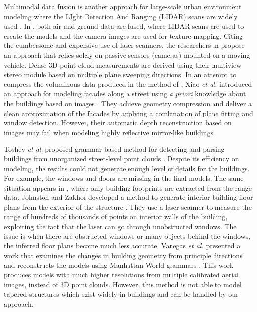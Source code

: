 \documentclass[10pt,journal,cspaper,compsoc]{IEEEtran}
\begin{document}
Multimodal data fusion is another approach for large-scale urban environment modeling 
where the LIght Detection And Ranging (LIDAR) scans are widely used \cite{UM_HYN}.
In \cite{UM_Zakhor}, both air and ground data are fused, 
where LIDAR scans are used to create the models 
and the camera images are used for texture mapping.
Citing the cumbersome and expensive use of laser scanners, the researchers
in \cite{AKBARZADEH06} propose an approach that relies solely on passive
sensors (cameras) mounted on a moving vehicle.
Dense 3D point cloud measurements are derived using their multiview stereo
module based on multiple plane sweeping directions.
In an attempt to compress the voluminous data produced in the method of
\cite{AKBARZADEH06}, 
Xiao {\it et al.} introduced an approach for modeling facades along a street 
using {\it a priori} knowledge about the buildings based on images \cite{UM_XFTQ}.
They achieve geometry compression and deliver a clean approximation of the
facades by applying a combination of plane fitting and window detection.
However, their automatic depth reconstruction based on images may fail
when modeling highly reflective mirror-like buildings.

Toshev {\it et al.} proposed grammar based method for detecting and parsing 
buildings from unorganized street-level point clouds \cite{RW_TMT} .
Despite its efficiency on modeling, the results could not generate 
enough level of details for the buildings. 
For example, the windows and doors are missing in the final models.
The same situation appears in \cite{RW_HDP}, where only building footprints 
are extracted from the range data.
Johnston and Zakhor developed a method to generate
interior building floor plans from the exterior of the structure \cite{RW_JZ}.
They use a laser scanner to measure the range of
hundreds of thousands of points on interior walls of the building, 
exploiting the fact that the laser can go through unobstructed windows.
The issue is when there are obstructed windows or many objects behind the windows, 
the inferred floor plans become much less accurate.
Vanegas {\it et al.} presented a work that examines the changes in
building geometry from principle directions and reconstructs the models 
using Manhattan-World grammars \cite{RW_VAB}. 
This work produces models with much higher resolutions from 
multiple calibrated aerial images, instead of 3D point clouds.
However, this method is not able to model tapered structures 
which exist widely in buildings and can be handled by our approach.

\end{document}
